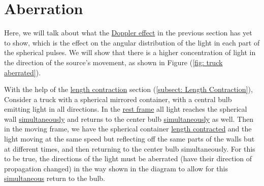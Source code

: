 \section{Aberration} \label{sect: Aberration}

Here, we will talk about what the \hyperlink{def-doppler-effect}{Doppler effect} in the previous section has yet to show, which is the effect on the angular distribution of the light in each part of the spherical pulses.
We will show that there is a higher concentration of light in the direction of the source's movement, as shown in Figure (\ref{fig: truck aberrated}).

With the help of the \hyperlink{def-length-contraction}{length contraction} section (\ref{subsect: Length Contraction}), Consider a truck with a spherical mirrored container, with a central bulb emitting light in all directions.
In the \hyperlink{def-proper-frame}{rest frame} all light reaches the spherical wall \hyperlink{def-simultaneity}{simultaneously} and returns to the center bulb \hyperlink{def-simultaneity}{simultaneously} as well.
Then in the moving frame, we have the spherical container \hyperlink{def-length-contraction}{length contracted} and the light moving at the same speed but reflecting off the same parts of the walls but at different times, and then returning to the center bulb simultaneously.
For this to be true, the directions of the light must be aberrated (have their direction of propagation changed) in the way shown in the diagram to allow for this \hyperlink{def-simultaneity}{simultaneous} return to the bulb.

